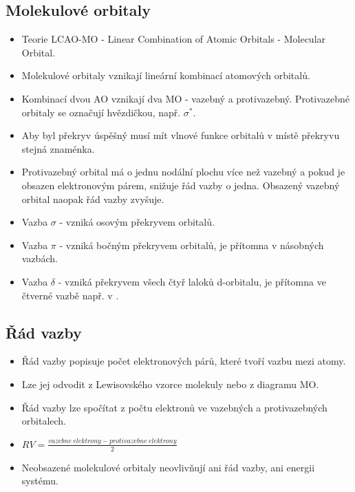 \subsection{Molekulové orbitaly}
\begin{itemize}
	\item Teorie LCAO-MO - Linear Combination of Atomic Orbitals - Molecular Orbital.
	\item Molekulové orbitaly vznikají lineární kombinací atomových orbitalů.
	\item Kombinací dvou AO vznikají dva MO - vazebný a protivazebný. Protivazebné orbitaly se označují hvězdičkou, např. $\sigma^*$.
	\item Aby byl překryv úspěšný musí mít vlnové funkce orbitalů v místě překryvu stejná znaménka.
	\item Protivazebný orbital má o jednu nodální plochu více než vazebný a pokud je obsazen elektronovým párem, snižuje řád vazby o jedna. Obsazený vazebný orbital naopak řád vazby zvyšuje.
	\item Vazba $\sigma$ - vzniká osovým překryvem orbitalů.
	\item Vazba $\pi$ - vzniká bočným překryvem orbitalů, je přítomna v násobných vazbách.
	\item Vazba $\delta$ - vzniká překryvem všech čtyř laloků d-orbitalu, je přítomna ve čtverné vazbě např. v \href{http://pubs.acs.org/doi/abs/10.1021/ic50025a015}{}.
\end{itemize}

\subsection{Řád vazby}
\begin{itemize}
	\item Řád vazby popisuje počet elektronových párů, které tvoří vazbu mezi atomy.
	\item Lze jej odvodit z Lewisovského vzorce molekuly nebo z diagramu MO.
\end{itemize}

\begin{center}
\end{center}

\begin{itemize}
	\item Řád vazby lze spočítat z počtu elektronů ve vazebných a protivazebných orbitalech.
	\item $RV = \frac{vazebne\ elektrony - protivazebne\ elektrony}{2}$

	\item Neobsazené molekulové orbitaly neovlivňují ani řád vazby, ani energii systému.
\end{itemize}

